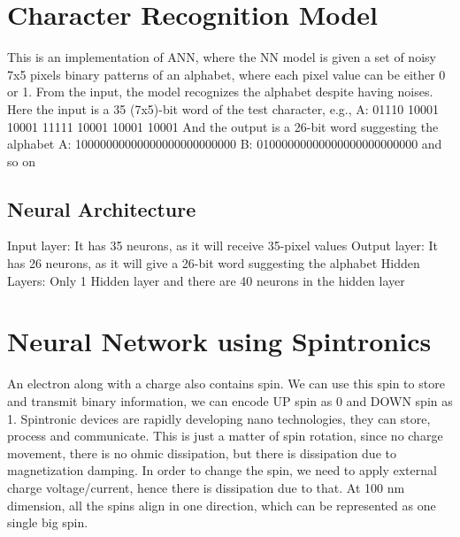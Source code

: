 \section{Character Recognition Model}
This is an implementation of ANN, where the NN model is given a set of noisy 7x5 pixels binary patterns of an alphabet, where each pixel value can be either 0 or 1. From the input, the model recognizes the alphabet despite having noises.
Here the input is a 35 (7x5)-bit word of the test character, e.g., 
A: 01110 10001 10001 11111 10001 10001 10001
And the output is a 26-bit word suggesting the alphabet
A: 10000000000000000000000000
B: 01000000000000000000000000 and so on

\subsection{Neural Architecture}
Input layer: It has 35 neurons, as it will receive 35-pixel values
Output layer: It has 26 neurons, as it will give a 26-bit word suggesting the alphabet 
Hidden Layers: Only 1 Hidden layer and there are 40 neurons in the hidden layer


\section{Neural Network using Spintronics}
An electron along with a charge also contains spin. We can use this spin to store and transmit binary information, we can encode UP spin as 0 and DOWN spin as 1. Spintronic devices are rapidly developing nano technologies, they can store, process and communicate. This is just a matter of spin rotation, since no charge movement, there is no ohmic dissipation, but there is dissipation due to magnetization damping. In order to change the spin, we need to apply external charge voltage/current, hence there is dissipation due to that. At 100 nm dimension, all the spins align in one direction, which can be represented as one single big spin.
